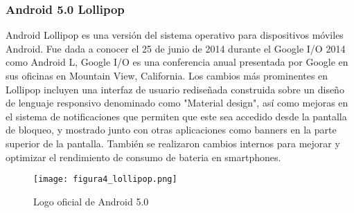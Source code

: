 		\newpage
		\thispagestyle{plain}
		
		\subsubsection{Android 5.0 Lollipop}
			\par 
				Android Lollipop es una versión del sistema operativo para dispositivos móviles Android. Fue dada a conocer el 25 de junio de 2014 durante el Google I/O 2014 como Android L, Google I/O es una conferencia anual presentada por Google en sus oficinas en Mountain View, California.
				Los cambios más prominentes en Lollipop incluyen una interfaz de usuario rediseñada construida sobre un diseño de lenguaje responsivo denominado como "Material design", así como mejoras en el sistema de notificaciones que permiten que este sea accedido desde la pantalla de bloqueo, y mostrado junto con otras aplicaciones como banners en la parte superior de la pantalla. También se realizaron cambios internos para mejorar y optimizar el rendimiento de consumo de bateria en smartphones.
				
			\begin{figure}[h]
				\centering
				\texttt{[image: figura4\_lollipop.png]}
				\caption{Logo oficial de Android 5.0}
			\end{figure}